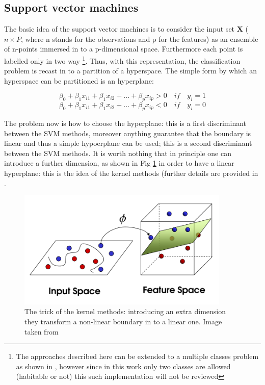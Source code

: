 \documentclass[
12pt, %
a4paper, %
oneside, %
headinclude,footinclude, %
BCOR5mm, %
]{scrartcl}
\begin{document}
\clearpage
\subsection{Support vector machines}
The basic idea of the support vector machines is to consider the input set \textbf{X} ($n\times P$, where n stands for the observations and p for the features) as an ensemble of n-points immersed in to a p-dimensional space. Furthermore each point is labelled only in two way \footnote{The approaches described here can be extended to a multiple classes problem as shown in \cite{james2013introduction}, however since in this work only two classes are allowed (habitable or not) this such implementation will not be reviewed}. Thus, with this representation, the classification problem is recast in to a partition of a hyperspace. The simple form by which an hyperspace can be partitioned is an hyperplane: 

\begin{equation}
\beta_{0}+\beta_{1}x_{i1}+\beta_{1}x_{i2}+...+\beta_{p}x_{ip} > 0\quad if \quad y_{i}=1
\end{equation}
\begin{equation}
\beta_{0}+\beta_{1}x_{i1}+\beta_{1}x_{i2}+...+\beta_{p}x_{ip} < 0\quad if \quad y_{i}=0
\end{equation}

The problem now is how to choose the hyperplane: this is a first discriminant between the SVM methods, moreover anything guarantee that the boundary is linear and thus a simple hypoerplane can be used; this is a second discriminant between the SVM methods. It is worth nothing that in principle one can introduce a further dimension, as shown in Fig \ref{Kernel_methods} in order to have a linear hyperplane: this is the idea of the kernel methods (further details are provided in \cite{james2013introduction,marsland2015machine}. 
\begin{figure}[h]
\begin{center}
\includegraphics[width=0.9\textwidth]{Pic/kernel_trick.png}
\caption{The trick of the kernel methods: introducing an extra dimension they transform a non-linear boundary in to a linear one.  Image taken from \cite{kernel}}
\label{Kernel_methods}
\end{center}
\end{figure}
\end{document}
